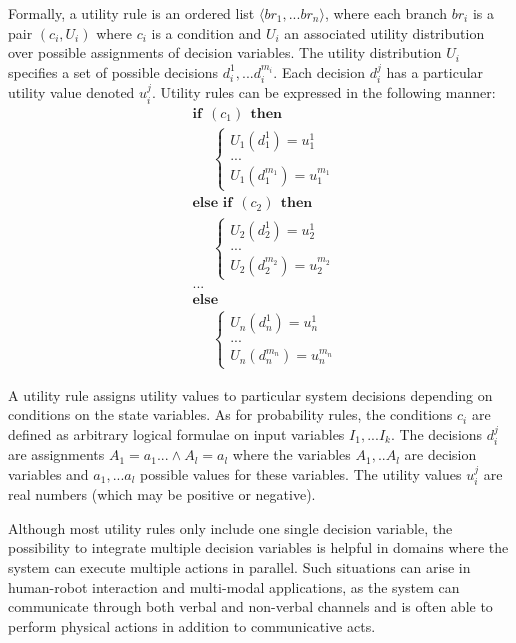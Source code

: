 Formally, a utility rule is an ordered list $\langle br_1, ... br_n\rangle$, where each branch $br_i$ is a pair $(c_i, U_i)$ where $c_i$ is a condition and $U_i$ an associated utility distribution over possible assignments of decision variables. The utility distribution $U_i$ specifies a set of possible decisions $d_i^1,... d_i^{m_i}$.  Each decision $d_i^j$ has a particular utility value denoted $u_i^j$.  Utility rules can be expressed in the following manner:
\begin{equation}
\begin{aligned}
& \textbf{if} \ \ (c_{1}) \ \ \textbf{then} \\ 
& \;\;\;\;\; \begin{cases}
U_1(d_1^1) = u_1^1 \\
 ... \\
U_1(d_1^{m_1}) = u_1^{m_1} 
\end{cases} \\[3mm]
& \textbf{else if} \ \ (c_{2}) \ \ \textbf{then} \\ 
& \;\;\;\;\; \begin{cases}
U_2(d_2^1) = u_2^1 \\
 ... \\
U_2(d_2^{m_2}) = u_2^{m_2} 
\end{cases} \\
& ...  \\
& \textbf{else} \\
& \;\;\;\;\; \begin{cases}
U_n(d_n^1) = u_n^1 \\
... \\
U_n(d_n^{m_n}) = u_n^{m_n}
\end{cases}
\end{aligned}
\end{equation}

A utility rule assigns utility values to particular system decisions depending on conditions on the state variables.  As for probability rules, the conditions $c_i$ are defined as arbitrary logical formulae on input variables $I_1,... I_k$.  The decisions $d_i^j$ are assignments $A_1\!=\!a_1 ... \land A_{l}\!=\!a_{l}$ where the variables $A_1,..A_{l}$ are decision variables and $a_1,...a_{l}$ possible values for these variables. The utility values $u_i^j$ are real numbers (which may be positive or negative).  

Although most utility rules only include one single decision variable, the possibility to integrate multiple decision variables is helpful in domains where the system can execute multiple actions in parallel. Such situations can arise in human-robot interaction and multi-modal applications, as the system can communicate through both verbal and non-verbal channels and is often able to perform physical actions in addition to communicative acts. 
 
